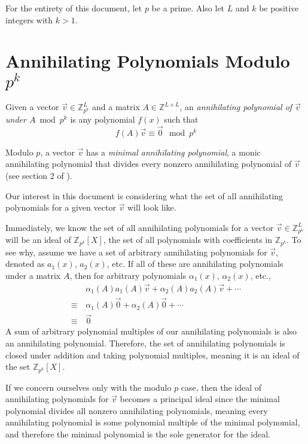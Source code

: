 \documentclass[a4paper, reqno, 12pt]{amsart}
\begin{document}
	For the entirety of this document, let $p$ be a prime. Also let $L$ and $k$ be positive integers with $k > 1$.
	
	\section{Annihilating Polynomials Modulo $p^k$}
		\label{sec:AP}
		Given a vector $\vec{v} \in \mathds{Z}_{p^k}^{L}$ and a matrix $A \in \mathds{Z}^{L \times L}$, an \emph{annihilating polynomial of $\vec{v}$ under $A \bmod{p^k}$} 
		is any polynomial $f(x)$ such that
		\[
			f(A)\vec{v} \equiv \vec{0} \mod{p^k}
		\]
		
		Modulo $p$, a vector $\vec{v}$ has a \emph{minimal annihilating polynomial}, a monic annihilating polynomial that divides every nonzero annihilating polynomial of 
		$\vec{v}$ (see section 2 of \citet{Mendivil2012}).
		
		Our interest in this document is considering what the set of all annihilating polynomials for a given vector $\vec{v}$ will look like.
		
		Immediately, we know the set of all annihilating polynomials for a vector $\vec{v} \in \mathds{Z}_{p^k}^L$ will be an ideal of $\mathds{Z}_{p^k}[X]$, the set of all 
		polynomials with coefficients in $\mathds{Z}_{p^k}$. To see why, assume we have a set of arbitrary annihilating polynomials for $\vec{v}$, denoted as $a_1(x)$, 
		$a_2(x)$, etc. If all of these are annihilating polynomials under a matrix $A$, then for arbitrary polynomials $\alpha_1(x)$, $\alpha_2(x)$, etc.,
		\begin{align*}
				   & \, \alpha_1(A)a_1(A)\vec{v} + \alpha_2(A)a_2(A)\vec{v} + \cdots \\
			\equiv & \, \alpha_1(A)\vec{0} + \alpha_2(A)\vec{0} + \cdots             \\
			\equiv & \, \vec{0}
		\end{align*}
		A sum of arbitrary polynomial multiples of our annihilating polynomials is also an annihilating polynomial. Therefore, the set of annihilating polynomials is closed 
		under addition and taking polynomial multiples, meaning it is an ideal of the set $\mathds{Z}_{p^k}[X]$.
		
		If we concern ourselves only with the modulo $p$ case, then the ideal of annihilating polynomials for $\vec{v}$ becomes a principal ideal since the minimal 
		polynomial divides all nonzero annihilating polynomials, meaning every annihilating polynomial is some polynomial multiple of the minimal polynomial, and therefore 
		the minimal polynomial is the sole generator for the ideal.
		
\end{document}
